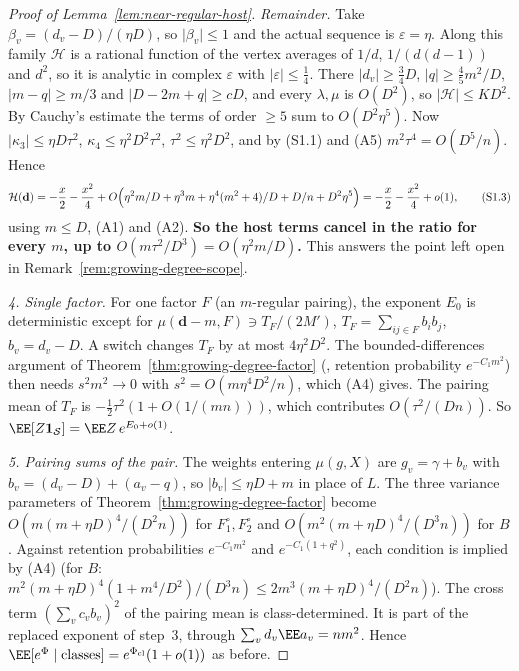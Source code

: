 \begin{proof}[Proof of Lemma~\ref{lem:near-regular-host}]
\emph{Remainder.} Take \(\beta_v=(d_v-D)/(\eta D)\), so \(\lvert\beta_v\rvert\le1\)
and the actual sequence is \(\varepsilon=\eta\). Along this family
\(\mathcal H\) is a rational function of the vertex averages of
\(1/d\), \(1/(d(d-1))\) and \(d^2\), so it is analytic in complex \(\varepsilon\)
with \(\lvert\varepsilon\rvert\le\tfrac14\). There \(\lvert d_v\rvert\ge\tfrac34D\),
\(\lvert q\rvert\ge\tfrac45m^2/D\), \(\lvert m-q\rvert\ge m/3\) and
\(\lvert D-2m+q\rvert\ge cD\), and every \(\lambda,\mu\) is \(O(D^2)\), so
\(\lvert\mathcal H\rvert\le KD^2\). By Cauchy's estimate the terms of order
\(\ge5\) sum to \(O(D^2\eta^5)\). Now \(\lvert\kappa_3\rvert\le\eta D\tau^2\),
\(\kappa_4\le\eta^2D^2\tau^2\), \(\tau^2\le\eta^2D^2\), and by (S1.1) and (A5)
\(m^2\tau^4=O(D^5/n)\). Hence
\[
\mathcal H(\mathbf d)=-\frac x2-\frac{x^2}4
+O\Bigl(\eta^2m/D+\eta^3m+\eta^4(m^2+4)/D+D/n+D^2\eta^5\Bigr)
=-\frac x2-\frac{x^2}4+o(1),
\tag{S1.3}
\]
using \(m\le D\), (A1) and (A2). \textbf{So the host terms cancel in the ratio
for every \(m\), up to \(O(m\tau^2/D^3)=O(\eta^2m/D)\).} This answers the point
left open in Remark~\ref{rem:growing-degree-scope}.

\emph{4. Single factor.} For one factor \(F\) (an \(m\)-regular pairing), the
exponent \(E_0\) is deterministic except for
\(\mu(\mathbf d-m,F)\ni T_F/(2M')\), \(T_F=\sum_{ij\in F}b_ib_j\),
\(b_v=d_v-D\). A switch changes \(T_F\) by at most \(4\eta^2D^2\). The bounded-differences argument of
Theorem~\ref{thm:growing-degree-factor} (\cite[Theorem~2.19]{Wormald99}, retention
probability \(e^{-C_1m^2}\)) then needs \(s^2m^2\to0\) with
\(s^2=O(m\eta^4D^2/n)\), which (A4) gives. The pairing mean of \(T_F\) is
\(-\tfrac12\tau^2(1+O(1/(mn)))\), which contributes \(O(\tau^2/(Dn))\). So
\(\EE[Z\mathbf 1_{\mathcal S}]=\EE Z\,e^{E_0+o(1)}\).

\emph{5. Pairing sums of the pair.} The weights entering \(\mu(g,X)\) are
\(g_v=\gamma+b_v\) with \(b_v=(d_v-D)+(a_v-q)\), so \(\lvert b_v\rvert\le\eta D+m\)
in place of \(L\). The three variance parameters of
Theorem~\ref{thm:growing-degree-factor} become
\(O(m(m+\eta D)^4/(D^2n))\) for \(F_1^\circ,F_2^\circ\) and
\(O(m^2(m+\eta D)^4/(D^3n))\) for \(B\). Against retention probabilities
\(e^{-C_1m^2}\) and \(e^{-C_1(1+q^2)}\), each condition is implied by (A4)
(for \(B\): \(m^2(m+\eta D)^4(1+m^4/D^2)/(D^3n)\le2m^3(m+\eta D)^4/(D^2n)\)).
The cross term \((\sum_vc_vb_v)^2\) of the pairing mean is class-determined. It is
part of the replaced exponent of step~3, through \(\sum_vd_v\EE a_v=nm^2\). Hence
\(\EE[e^\Phi\mid\text{classes}]=e^{\Phi_{\mathrm{cl}}}(1+o(1))\) as before.


\end{proof}
